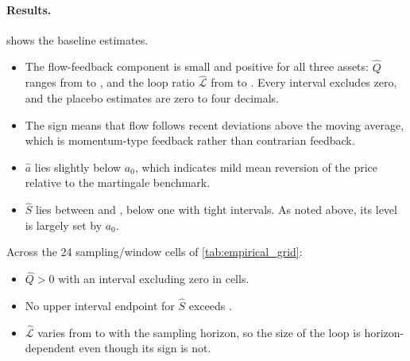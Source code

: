\documentclass[10pt,twocolumn,letterpaper]{article}
\theoremstyle{definition}
\theoremstyle{remark}
\begin{document}
\begin{table}[htbp]\centering\scriptsize
\caption{Baseline estimates ($\Delta=10$\,s, $W=300$\,s), computed by \texttt{empirical\_pipeline/feedback\_var.py}. $a_0$ is the martingale benchmark. Intervals are 95\% Student-$t$ intervals across asset-days. The placebo pairs $x$ and $f$ from different days.}
\label{tab:empirical_feedback}

\end{table}

\paragraph{Results.}  shows the baseline estimates.
\begin{itemize}
 \item The flow-feedback component is small and positive for all three assets: $\hat Q$ ranges from \EmpQmin{} to \EmpQmax{}, and the loop ratio $\hat{\mathcal L}$ from \EmpLmin{} to \EmpLmax{}. Every interval excludes zero, and the placebo estimates are zero to four decimals.
 \item The sign means that flow follows recent deviations above the moving average, which is momentum-type feedback rather than contrarian feedback.
 \item $\hat a$ lies slightly below $a_0$, which indicates mild mean reversion of the price relative to the martingale benchmark.
 \item $\hat S$ lies between \EmpSmin{} and \EmpSmax{}, below one with tight intervals. As noted above, its level is largely set by $a_0$.
\end{itemize}
Across the 24 sampling/window cells of \cref{tab:empirical_grid}:
\begin{itemize}
 \item $\hat Q>0$ with an interval excluding zero in \EmpGridQallPositive{} cells.
 \item No upper interval endpoint for $\hat S$ exceeds \EmpGridSmaxUpper.
 \item $\hat{\mathcal L}$ varies from \EmpGridLmin{} to \EmpGridLmax{} with the sampling horizon, so the size of the loop is horizon-dependent even though its sign is not.
\end{itemize}
\end{document}
